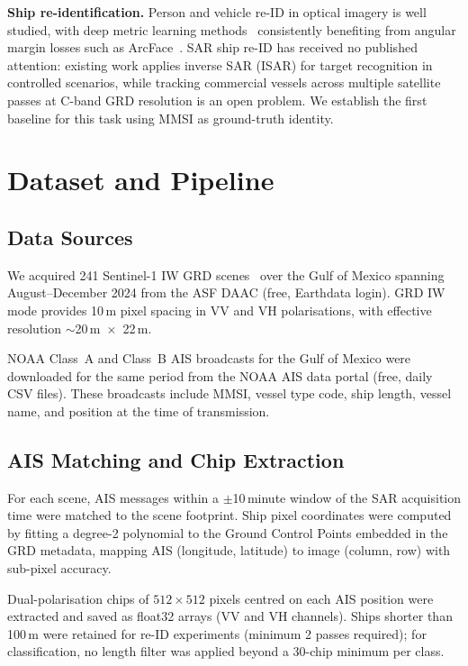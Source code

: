 \documentclass[journal]{IEEEtran}
\begin{document}
\textbf{Ship re-identification.}
Person and vehicle re-ID in optical imagery is well studied, with deep metric
learning methods~\cite{ye2021reid} consistently benefiting from angular margin
losses such as ArcFace~\cite{deng2019}.
SAR ship re-ID has received no published attention: existing work applies
inverse SAR (ISAR) for target recognition in controlled scenarios, while
tracking commercial vessels across multiple satellite passes at C-band GRD
resolution is an open problem.
We establish the first baseline for this task using MMSI as ground-truth identity.

\section{Dataset and Pipeline}
\label{sec:data}

\subsection{Data Sources}

We acquired 241 Sentinel-1 IW GRD scenes~\cite{torres2012} over the Gulf of Mexico
spanning August--December 2024 from the ASF DAAC (free, Earthdata login).
GRD IW mode provides 10\,m pixel spacing in VV and VH polarisations,
with effective resolution $\sim$20\,m~$\times$~22\,m.

NOAA Class~A and Class~B AIS broadcasts for the Gulf of Mexico were
downloaded for the same period from the NOAA AIS data portal (free,
daily CSV files).
These broadcasts include MMSI, vessel type code, ship length, vessel name,
and position at the time of transmission.

\subsection{AIS Matching and Chip Extraction}

For each scene, AIS messages within a $\pm$10\,minute window of the SAR
acquisition time were matched to the scene footprint.
Ship pixel coordinates were computed by fitting a degree-2 polynomial to
the Ground Control Points embedded in the GRD metadata, mapping AIS
(longitude, latitude) to image (column, row) with sub-pixel accuracy.

Dual-polarisation chips of $512\times512$ pixels centred on each AIS
position were extracted and saved as float32 arrays (VV and VH channels).
Ships shorter than 100\,m were retained for re-ID experiments
(minimum 2 passes required); for classification, no length filter was
applied beyond a 30-chip minimum per class.
\end{document}
